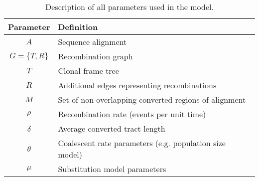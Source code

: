 \documentclass[a4paper,10pt]{article}
\begin{document}


\begin{table}
\begin{tabular}{|cl|}
  \hline
  Parameter & Definition \\
  \hline
  $A$ & Sequence alignment \\
  $G=\{T,R\}$ & Recombination graph \\
  $T$ & Clonal frame tree \\
  $R$ & Additional edges representing recombinations \\
  $M$ & Set of non-overlapping converted regions of alignment \\
  $\rho$ & Recombination rate (events per unit time) \\
  $\delta$ & Average converted tract length \\
  $\theta$ & Coalescent rate parameters (e.g. population size model) \\
  $\mu$ & Substitution model parameters \\
  \hline
\end{tabular}
\caption{Description of all parameters used in the model.}
\end{table}

%
%
\end{document}
